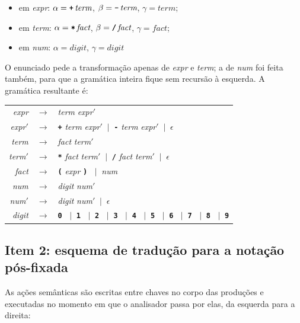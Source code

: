 \documentclass[11pt,a4paper]{article}
\newcommand{\nt}[1]{\textit{#1}}                 %
\newcommand{\tm}[1]{\texttt{\textbf{#1}}}        %
\newcommand{\pr}{\ensuremath{\rightarrow}}
\newcommand{\ou}{\ensuremath{\;\mid\;}}
\newcommand{\vazio}{\ensuremath{\epsilon}}
\newcommand{\linha}{\ensuremath{'}}
\begin{document}
	\begin{itemize}[nosep]
		\item em \nt{expr}: $\alpha = \tm{+}\,\nt{term}$, $\beta = \tm{-}\,\nt{term}$, $\gamma = \nt{term}$;
		\item em \nt{term}: $\alpha = \tm{*}\,\nt{fact}$, $\beta = \tm{/}\,\nt{fact}$, $\gamma = \nt{fact}$;
		\item em \nt{num}: $\alpha = \nt{digit}$, $\gamma = \nt{digit}$
	\end{itemize}
	
	O enunciado pede a transformação apenas de \nt{expr} e \nt{term}; a de \nt{num} foi feita também, para que a gramática inteira fique sem recursão à esquerda. A gramática resultante é:
	
	\begin{center}
		\begin{tabular}{r@{\;\;}c@{\;\;}l}
			\nt{expr}            & \pr & \nt{term} \nt{expr}\linha \\
			\nt{expr}\linha      & \pr & \tm{+} \nt{term} \nt{expr}\linha \ou \tm{-} \nt{term} \nt{expr}\linha \ou \vazio \\
			\nt{term}            & \pr & \nt{fact} \nt{term}\linha \\
			\nt{term}\linha      & \pr & \tm{*} \nt{fact} \nt{term}\linha \ou \tm{/} \nt{fact} \nt{term}\linha \ou \vazio \\
			\nt{fact}            & \pr & \tm{(} \nt{expr} \tm{)} \ou \nt{num} \\
			\nt{num}             & \pr & \nt{digit} \nt{num}\linha \\
			\nt{num}\linha       & \pr & \nt{digit} \nt{num}\linha \ou \vazio \\
			\nt{digit}           & \pr & \tm{0} \ou \tm{1} \ou \tm{2} \ou \tm{3} \ou \tm{4} \ou \tm{5} \ou \tm{6} \ou \tm{7} \ou \tm{8} \ou \tm{9}
		\end{tabular}
	\end{center}
	
	\subsection{Item 2: esquema de tradução para a notação pós-fixada}
	
	As ações semânticas são escritas entre chaves no corpo das produções e executadas no momento em que o analisador passa por elas, da esquerda para a direita:
	
\end{document}

